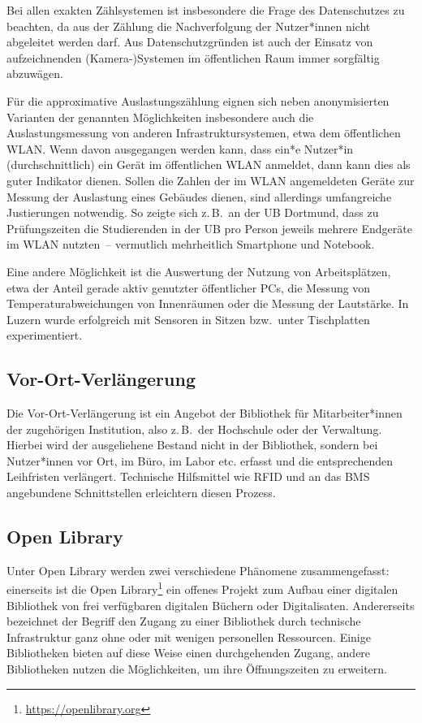 \documentclass[
  11pt,
  letterpaper,
  DIV=11,
  twoside]{scrreprt}
\DeclareRobustCommand{\href}[2]{#2\footnote{\url{#1}}}
\begin{document}
Bei allen exakten Zählsystemen ist insbesondere die Frage des
Datenschutzes zu beachten, da aus der Zählung die Nachverfolgung der
Nutzer*innen nicht abgeleitet werden darf. Aus Datenschutzgründen ist
auch der Einsatz von aufzeichnenden (Kamera-)Systemen im öffentlichen
Raum immer sorgfältig abzuwägen.

Für die approximative Auslastungszählung eignen sich neben
anonymisierten Varianten der genannten Möglichkeiten insbesondere auch
die Auslastungsmessung von anderen Infrastruktursystemen, etwa dem
öffentlichen WLAN. Wenn davon ausgegangen werden kann, dass ein*e
Nutzer*in (durchschnittlich) ein Gerät im öffentlichen WLAN anmeldet,
dann kann dies als guter Indikator dienen. Sollen die Zahlen der im WLAN
angemeldeten Geräte zur Messung der Auslastung eines Gebäudes dienen,
sind allerdings umfangreiche Justierungen notwendig. So zeigte sich
z.\,B.~an der UB Dortmund, dass zu Prüfungszeiten die Studierenden in
der UB pro Person jeweils mehrere Endgeräte im WLAN nutzten~--
vermutlich mehrheitlich Smartphone und Notebook.

Eine andere Möglichkeit ist die Auswertung der Nutzung von
Arbeitsplätzen, etwa der Anteil gerade aktiv genutzter öffentlicher PCs,
die Messung von Temperaturabweichungen von Innenräumen oder die Messung
der Lautstärke. In Luzern wurde erfolgreich mit Sensoren in Sitzen
bzw.~unter Tischplatten experimentiert.

\subsection{Vor-Ort-Verlängerung}\label{vor-ort-verluxe4ngerung}

Die Vor-Ort-Verlängerung ist ein Angebot der Bibliothek für
Mitarbeiter*innen der zugehörigen Institution, also z.\,B.~der
Hochschule oder der Verwaltung. Hierbei wird der ausgeliehene Bestand
nicht in der Bibliothek, sondern bei Nutzer*innen vor Ort, im Büro, im
Labor etc. erfasst und die entsprechenden Leihfristen verlängert.
Technische Hilfsmittel wie RFID und an das BMS angebundene
Schnittstellen erleichtern diesen Prozess.

\subsection{Open Library}\label{open-library}

Unter Open Library werden zwei verschiedene Phänomene zusammengefasst:
einerseits ist die \href{https://openlibrary.org}{Open Library} ein
offenes Projekt zum Aufbau einer digitalen Bibliothek von frei
verfügbaren digitalen Büchern oder Digitalisaten. Andererseits
bezeichnet der Begriff den Zugang zu einer Bibliothek durch technische
Infrastruktur ganz ohne oder mit wenigen personellen Ressourcen. Einige
Bibliotheken bieten auf diese Weise einen durchgehenden Zugang, andere
Bibliotheken nutzen die Möglichkeiten, um ihre Öffnungszeiten zu
erweitern.
\end{document}
